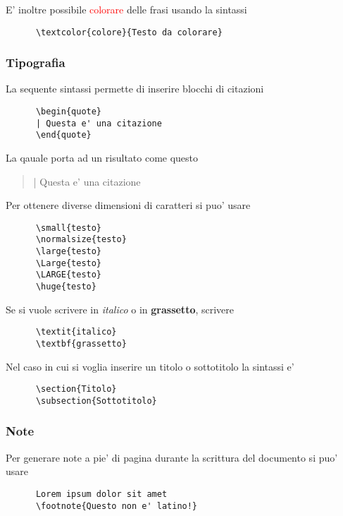 \documentclass{article}
\begin{document}
{    E' inoltre possibile \textcolor{red}{colorare} delle frasi usando la sintassi
    \begin{verbatim}
      \textcolor{colore}{Testo da colorare}
    \end{verbatim}

    \subsubsection{Tipografia} %
    La sequente sintassi permette di inserire blocchi di citazioni
    \begin{verbatim}
      \begin{quote}
      | Questa e' una citazione
      \end{quote}
    \end{verbatim}

    La qauale porta ad un risultato come questo
    \begin{quote}
      | Questa e' una citazione
    \end{quote}

    Per ottenere diverse dimensioni di caratteri si puo' usare
    \begin{verbatim}
      \small{testo}
      \normalsize{testo}
      \large{testo}
      \Large{testo}
      \LARGE{testo}
      \huge{testo}
    \end{verbatim}

    Se si vuole scrivere in \textit{italico} o in \textbf{grassetto}, scrivere
    \begin{verbatim}
      \textit{italico}
      \textbf{grassetto}
    \end{verbatim}

    Nel caso in cui si voglia inserire un titolo o sottotitolo la sintassi e'
    \begin{verbatim}
      \section{Titolo}
      \subsection{Sottotitolo}
    \end{verbatim}

    \subsubsection{Note} %
    Per generare note a pie' di pagina durante la scrittura del documento si puo' usare
    \begin{verbatim}
      Lorem ipsum dolor sit amet
      \footnote{Questo non e' latino!}
    \end{verbatim}
  }
\end{document}
